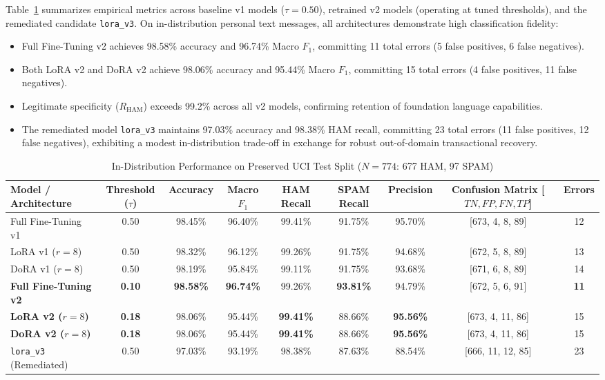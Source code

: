 \documentclass[conference]{IEEEtran}
\begin{document}
Table~\ref{tab:uci_test_results} summarizes empirical metrics across baseline v1 models ($\tau = 0.50$), retrained v2 models (operating at tuned thresholds), and the remediated candidate \texttt{lora\_v3}. On in-distribution personal text messages, all architectures demonstrate high classification fidelity:
\begin{itemize}
    \item Full Fine-Tuning v2 achieves 98.58\% accuracy and 96.74\% Macro $F_1$, committing 11 total errors (5 false positives, 6 false negatives).
    \item Both LoRA v2 and DoRA v2 achieve 98.06\% accuracy and 95.44\% Macro $F_1$, committing 15 total errors (4 false positives, 11 false negatives).
    \item Legitimate specificity ($R_{\text{HAM}}$) exceeds 99.2\% across all v2 models, confirming retention of foundation language capabilities.
    \item The remediated model \texttt{lora\_v3} maintains 97.03\% accuracy and 98.38\% HAM recall, committing 23 total errors (11 false positives, 12 false negatives), exhibiting a modest in-distribution trade-off in exchange for robust out-of-domain transactional recovery.
\end{itemize}

\begin{table}[t]
\caption{In-Distribution Performance on Preserved UCI Test Split ($N=774$: 677 HAM, 97 SPAM)}
\label{tab:uci_test_results}
\centering
\begin{tabularx}{\textwidth}{lcccccccc}
\toprule
\textbf{Model / Architecture} & \textbf{Threshold ($\tau$)} & \textbf{Accuracy} & \textbf{Macro $F_1$} & \textbf{HAM Recall} & \textbf{SPAM Recall} & \textbf{Precision} & \textbf{Confusion Matrix [$TN, FP, FN, TP$]} & \textbf{Errors} \\
\midrule
Full Fine-Tuning v1 & 0.50 & 98.45\% & 96.40\% & 99.41\% & 91.75\% & 95.70\% & [673, 4, 8, 89] & 12 \\
LoRA v1 ($r=8$) & 0.50 & 98.32\% & 96.12\% & 99.26\% & 91.75\% & 94.68\% & [672, 5, 8, 89] & 13 \\
DoRA v1 ($r=8$) & 0.50 & 98.19\% & 95.84\% & 99.11\% & 91.75\% & 93.68\% & [671, 6, 8, 89] & 14 \\
\midrule
\textbf{Full Fine-Tuning v2} & \textbf{0.10} & \textbf{98.58\%} & \textbf{96.74\%} & 99.26\% & \textbf{93.81\%} & 94.79\% & [672, 5, 6, 91] & \textbf{11} \\
\textbf{LoRA v2 ($r=8$)} & \textbf{0.18} & 98.06\% & 95.44\% & \textbf{99.41\%} & 88.66\% & \textbf{95.56\%} & [673, 4, 11, 86] & 15 \\
\textbf{DoRA v2 ($r=8$)} & \textbf{0.18} & 98.06\% & 95.44\% & \textbf{99.41\%} & 88.66\% & \textbf{95.56\%} & [673, 4, 11, 86] & 15 \\
\midrule
\texttt{lora\_v3} (Remediated) & 0.50 & 97.03\% & 93.19\% & 98.38\% & 87.63\% & 88.54\% & [666, 11, 12, 85] & 23 \\
\bottomrule
\end{tabularx}
\end{table}
\end{document}
